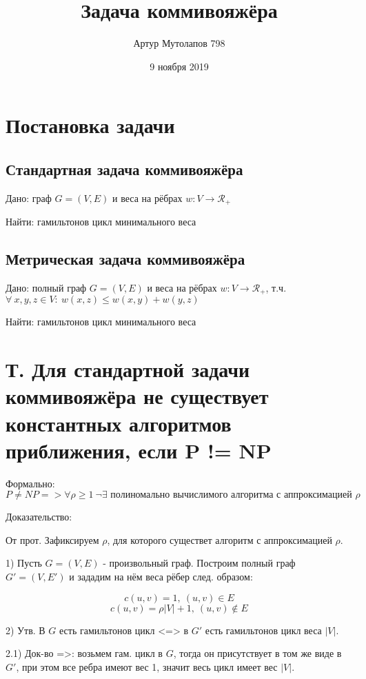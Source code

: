 \documentclass[a4paper,12pt]{article}
\title{Задача коммивояжёра}
\author{Артур Мутолапов 798}
\date{9 ноября 2019}
\begin{document}
\maketitle

\section{Постановка задачи}

\subsection{Стандартная задача коммивояжёра}
Дано: граф $ G = (V, E) $ и веса на рёбрах $ w: V \rightarrow \mathscr{R}_{+}$

Найти: гамильтонов цикл минимального веса

\subsection{Метрическая задача коммивояжёра}

Дано: полный граф $ G = (V, E) $ и веса на рёбрах $ w: V \rightarrow \mathscr{R}_{+}$, т.ч. $\forall \: x, y, z \in V : \: w(x, z) \leq w(x, y) + w(y, z)$ 

Найти: гамильтонов цикл минимального веса

\section{Т. Для стандартной задачи коммивояжёра не существует константных алгоритмов приближения, если P != NP}

Формально: 
$$ P \neq NP => \forall \rho \geq 1 \: \neg{\exists} \text{ полиномально вычислимого алгоритма с аппроксимацией } \rho
$$

Доказательство:

От прот. Зафиксируем $\rho$, для которого существет алгоритм с аппроксимацией $\rho$.

1) Пусть $ G = (V, E)$ - произвольный граф. Построим полный граф $ G' = (V, E')$ и зададим на нём веса рёбер след. образом:

$$ c(u, v) = 1, \: (u,v) \in E $$
$$ c(u, v) = \rho |V| + 1, \: (u,v) \notin E $$

2) Утв. В $G$ есть гамильтонов цикл <=> в $G'$ есть гамильтонов цикл веса $|V|$.

2.1) Док-во =>: возьмем гам. цикл в $G$, тогда он присутствует в том же виде в $G'$, при этом все ребра имеют вес 1, значит весь цикл имеет вес $|V|$.
\end{document}
